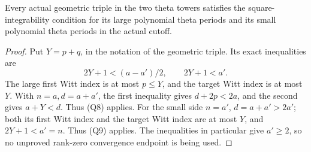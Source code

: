 \begin{srcorollary}
\label{cor:sr-theta-SqInt}
Every actual geometric triple in the two theta towers satisfies the
square-integrability condition for its large polynomial theta periods
and its small polynomial theta periods in the actual cutoff.
\end{srcorollary}

\begin{proof}
Put \(Y=p+q\), in the notation of the geometric triple.
Its exact inequalities are
\[
 2Y+1<(a-a')/2,\qquad 2Y+1<a'.
\]
The large first Witt index is at most \(p\le Y\), and the target
Witt index is at most \(Y\).
With \(n=a,d=a+a'\), the first inequality gives
\(d+2p<2a\), and the second gives \(a+Y<d\).
Thus (Q8) applies.
For the small side \(n=a'\), \(d=a+a'>2a'\);
both its first Witt index and the target Witt index are at most
\(Y\), and \(2Y+1<a'=n\). Thus (Q9) applies.
The inequalities in particular give \(a'\ge2\), so no unproved
rank-zero convergence endpoint is being used.
\end{proof}

